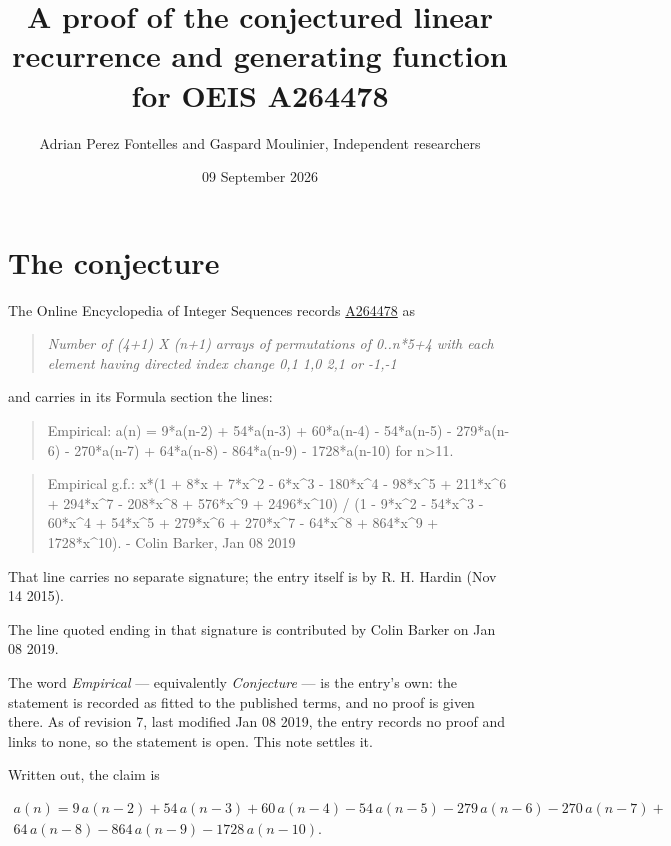 \documentclass[11pt]{article}
\title{A proof of the conjectured linear recurrence and generating function for OEIS A264478}
\author{Adrian Perez Fontelles and Gaspard Moulinier, Independent researchers}
\date{09 September 2026}
\theoremstyle{definition}
\begin{document}
\maketitle
\section{The conjecture}

The Online Encyclopedia of Integer Sequences records \href{https://oeis.org/A264478}{A264478} as

\begin{quote}\itshape Number of (4+1) X (n+1) arrays of permutations of 0..n*5+4 with each element having directed index change 0,1 1,0 2,1 or -1,-1\end{quote}

and carries in its Formula section the lines:

\begin{quote}\ttfamily Empirical: a(n) = 9*a(n-2) + 54*a(n-3) + 60*a(n-4) - 54*a(n-5) - 279*a(n-6) - 270*a(n-7) + 64*a(n-8) - 864*a(n-9) - 1728*a(n-10) for n>11.\end{quote}

\begin{quote}\ttfamily Empirical g.f.: x*(1 + 8*x + 7*x\textasciicircum{}2 - 6*x\textasciicircum{}3 - 180*x\textasciicircum{}4 - 98*x\textasciicircum{}5 + 211*x\textasciicircum{}6 + 294*x\textasciicircum{}7 - 208*x\textasciicircum{}8 + 576*x\textasciicircum{}9 + 2496*x\textasciicircum{}10) / (1 - 9*x\textasciicircum{}2 - 54*x\textasciicircum{}3 - 60*x\textasciicircum{}4 + 54*x\textasciicircum{}5 + 279*x\textasciicircum{}6 + 270*x\textasciicircum{}7 - 64*x\textasciicircum{}8 + 864*x\textasciicircum{}9 + 1728*x\textasciicircum{}10). - Colin Barker, Jan 08 2019\end{quote}

That line carries no separate signature; the entry itself is by R. H. Hardin (Nov 14 2015).

The line quoted ending in that signature is contributed by Colin Barker on Jan 08 2019.

The word {\itshape Empirical} --- equivalently {\itshape Conjecture} --- is the entry's own: the statement is recorded as fitted to the published terms, and no proof is given there. As of revision 7, last modified Jan 08 2019, the entry records no proof and links to none, so the statement is open. This note settles it.

Written out, the claim is

\begin{multline*} a(n) = 9\,a(n-2) + 54\,a(n-3) + 60\,a(n-4) - 54\,a(n-5) - 279\,a(n-6) - 270\,a(n-7) + \\ 64\,a(n-8) - 864\,a(n-9) - 1728\,a(n-10). \end{multline*}
\end{document}
